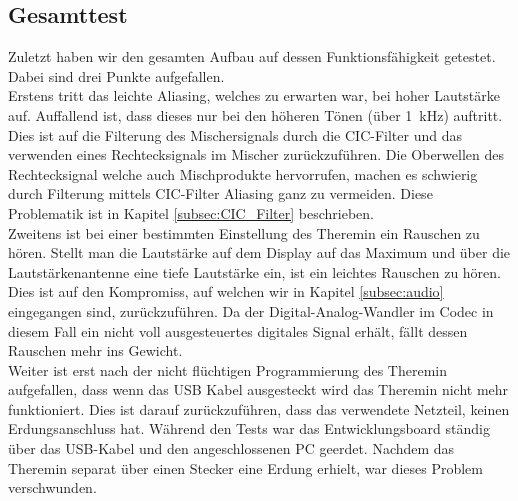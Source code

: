 \subsection{Gesamttest}\label{subsec:Gesammttest}
Zuletzt haben wir den gesamten Aufbau auf dessen Funktionsfähigkeit getestet. Dabei sind drei Punkte aufgefallen.\\
Erstens tritt das leichte Aliasing, welches zu erwarten war, bei hoher Lautstärke auf. Auffallend ist, dass dieses nur bei den höheren Tönen (über \SI{1}{kHz}) auftritt. Dies ist auf die Filterung des Mischersignals durch die CIC-Filter und das verwenden eines Rechtecksignals im Mischer zurückzuführen. Die Oberwellen des Rechtecksignal welche auch Mischprodukte hervorrufen, machen es schwierig durch Filterung mittels CIC-Filter Aliasing ganz zu vermeiden. Diese Problematik ist in Kapitel \ref{subsec:CIC_Filter} beschrieben.\\
Zweitens ist bei einer bestimmten Einstellung des Theremin ein Rauschen zu hören. Stellt man die Lautstärke auf dem Display auf das Maximum und über die Lautstärkenantenne eine tiefe Lautstärke ein, ist ein leichtes Rauschen zu hören. Dies ist auf den Kompromiss, auf welchen wir in Kapitel \ref{subsec:audio} eingegangen sind, zurückzuführen. Da der Digital-Analog-Wandler im Codec in diesem Fall ein nicht voll ausgesteuertes digitales Signal erhält, fällt dessen Rauschen mehr ins Gewicht.\\
Weiter ist erst nach der nicht flüchtigen Programmierung des Theremin aufgefallen, dass wenn das USB Kabel ausgesteckt wird das Theremin nicht mehr funktioniert. Dies ist darauf zurückzuführen, dass das verwendete Netzteil, keinen Erdungsanschluss hat. Während den Tests war das Entwicklungsboard ständig über das USB-Kabel und den angeschlossenen PC geerdet. Nachdem das Theremin separat über einen Stecker eine Erdung erhielt, war dieses Problem verschwunden.


